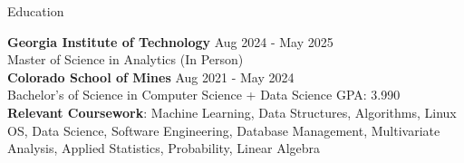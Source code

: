 \documentclass{resume} %
\begin{document}
\vspace{-10pt}

\begin{rSection}{Education}

{\bf Georgia Institute of Technology} \hfill {Aug 2024 - May 2025}\\
Master of Science in Analytics (In Person) \\
{\bf Colorado School of Mines} \hfill {Aug 2021 - May 2024}\\
Bachelor's of Science in Computer Science + Data Science \hfill {GPA: 3.990}\\
\textbf{Relevant Coursework}: Machine Learning, Data Structures, Algorithms, Linux OS, Data Science, Software Engineering, Database Management, Multivariate Analysis, Applied Statistics, Probability, Linear Algebra



\end{rSection}
\vspace{-6pt}
\end{document}
